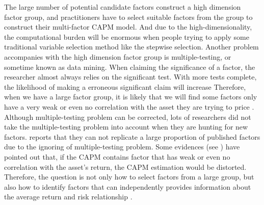  The large number of potential candidate factors construct a high dimension factor group, and practitioners have to select suitable factors from the group to construct their multi-factor CAPM model. 
And due to the high-dimensionality, the computational burden will be enormous when people trying to apply some traditional variable selection method like the stepwise selection.
Another problem accompanies with the high dimension factor group is multiple-testing, or sometime known as data mining. 
When claiming the significance of a factor, the researcher almost always relies on the significant test. With more tests complete, the likelihood of making a erroneous significant claim will increase
Therefore, when we have a large factor group, it is likely that we will find some factors only have a very weak or even no correlation with the asset they are trying to price \cite{Harvey2017}.
Although multiple-testing problem can be corrected, lots of researchers did not take the multiple-testing problem into account when they are hunting for new factors.
 reports that they can not replicate a large proportion of published factors due to the ignoring of multiple-testing problem.
Some evidences (see ) have pointed out that, if the CAPM contains factor that has weak or even no correlation with the asset's return, the CAPM estimation would be distorted.
Therefore, the question is not only how to select factors from a large group, but also how to identify factors that can independently provides information about the average return and risk relationship \cite{Cochrane2011}.

